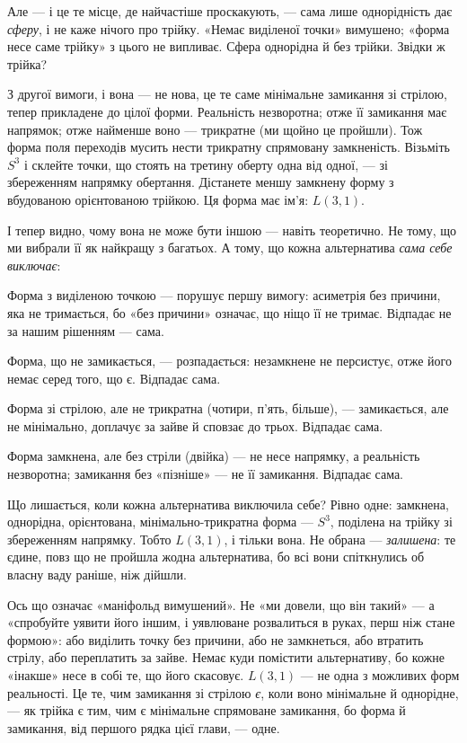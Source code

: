 \documentclass[12pt, a4paper, openany]{book}
\begin{document}
Але --- і це те місце, де найчастіше проскакують, --- сама лише однорідність дає \emph{сферу}, і не каже нічого про трійку. «Немає виділеної точки» вимушено; «форма несе саме трійку» з цього не випливає. Сфера однорідна й без трійки. Звідки ж трійка?

З другої вимоги, і вона --- не нова, це те саме мінімальне замикання зі стрілою, тепер прикладене до цілої форми. Реальність незворотна; отже її замикання має напрямок; отже найменше воно --- трикратне (ми щойно це пройшли). Тож форма поля переходів мусить нести трикратну спрямовану замкненість. Візьміть $S^3$ і склейте точки, що стоять на третину оберту одна від одної, --- зі збереженням напрямку обертання. Дістанете меншу замкнену форму з вбудованою орієнтованою трійкою. Ця форма має ім'я: $L(3,1)$.

І тепер видно, чому вона не може бути іншою --- навіть теоретично. Не тому, що ми вибрали її як найкращу з багатьох. А тому, що кожна альтернатива \emph{сама себе виключає}:

Форма з виділеною точкою --- порушує першу вимогу: асиметрія без причини, яка не тримається, бо «без причини» означає, що ніщо її не тримає. Відпадає не за нашим рішенням --- сама.

Форма, що не замикається, --- розпадається: незамкнене не персистує, отже його немає серед того, що є. Відпадає сама.

Форма зі стрілою, але не трикратна (чотири, п'ять, більше), --- замикається, але не мінімально, доплачує за зайве й сповзає до трьох. Відпадає сама.

Форма замкнена, але без стріли (двійка) --- не несе напрямку, а реальність незворотна; замикання без «пізніше» --- не її замикання. Відпадає сама.

Що лишається, коли кожна альтернатива виключила себе? Рівно одне: замкнена, однорідна, орієнтована, мінімально-трикратна форма --- $S^3$, поділена на трійку зі збереженням напрямку. Тобто $L(3,1)$, і тільки вона. Не обрана --- \emph{залишена}: те єдине, повз що не пройшла жодна альтернатива, бо всі вони спіткнулись об власну ваду раніше, ніж дійшли.

Ось що означає «маніфольд вимушений». Не «ми довели, що він такий» --- а «спробуйте уявити його іншим, і уявлюване розвалиться в руках, перш ніж стане формою»: або виділить точку без причини, або не замкнеться, або втратить стрілу, або переплатить за зайве. Немає куди помістити альтернативу, бо кожне «інакше» несе в собі те, що його скасовує. $L(3,1)$ --- не одна з можливих форм реальності. Це те, чим замикання зі стрілою \emph{є}, коли воно мінімальне й однорідне, --- як трійка є тим, чим є мінімальне спрямоване замикання, бо форма й замикання, від першого рядка цієї глави, --- одне.
\end{document}
